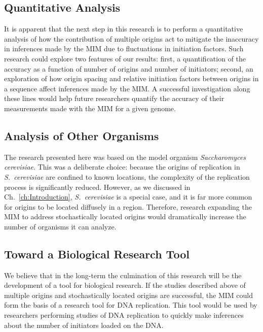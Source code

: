 		\subsection{Quantitative Analysis}
		
		It is apparent that the next step in this research is to perform a quantitative analysis of how the contribution of multiple origins act to mitigate the inaccuracy in inferences made by the MIM due to fluctuations in initiation factors.
		Such research could explore two features of our results:
		first, a quantification of the accuracy as a function of number of origins and number of initiators;
		second, an exploration of how origin spacing and relative initiation factors between origins in a sequence affect inferences made by the MIM.
		A successful investigation along these lines would help future researchers quantify the accuracy of their measurements made with the MIM for a given genome.
		
		
		\subsection{Analysis of Other Organisms}
		
		The research presented here was based on the model organism \emph{Saccharomyces cerevisiae}.
		This was a deliberate choice: because the origins of replication in \emph{S.~cerevisiae} are confined to known locations, the complexity of the replication process is significantly reduced.
		However, as we discussed in Ch.~\ref{ch:Introduction}, \emph{S.~cerevisiae} is a special case, and it is far more common for origins to be located diffusely in a region.
		Therefore, research expanding the MIM to address stochastically located origins would dramatically increase the number of organisms it can analyze.
		
		
		\subsection{Toward a Biological Research Tool}
		
		We believe that in the long-term  the culmination of this research will be the development of a tool for biological research.
		If the studies described above of multiple origins and stochastically located origins are successful, the MIM could form the basis of a research tool for DNA replication.
		This tool would be used by researchers performing studies of DNA replication to quickly make inferences about the number of initiators loaded on the DNA.
		
